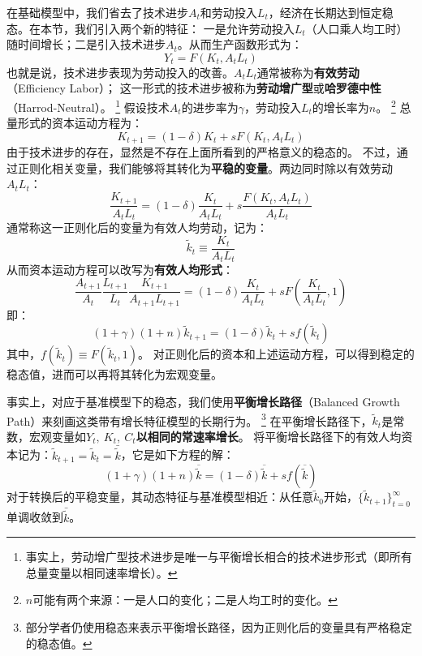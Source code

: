 在基础模型中，我们省去了技术进步$A_t$和劳动投入$L_t$，经济在长期达到恒定稳态。在本节，我们引入两个新的特征：
一是允许劳动投入$L_t$（人口乘人均工时）随时间增长；二是引入技术进步$A_t$。从而生产函数形式为：
\begin{equation*}
    Y_t = F\left(K_t, A_tL_t\right)
\end{equation*}
也就是说，技术进步表现为劳动投入的改善。$A_tL_t$通常被称为\textbf{有效劳动}（Efficiency Labor）；
这一形式的技术进步被称为\textbf{劳动增广型}或\textbf{哈罗德中性}（Harrod-Neutral）。
\footnote{事实上，劳动增广型技术进步是唯一与平衡增长相合的技术进步形式（即所有总量变量以相同速率增长）。}
假设技术$A_t$的进步率为$\gamma$，劳动投入$L_t$的增长率为$n$。
\footnote{$n$可能有两个来源：一是人口的变化；二是人均工时的变化。}
总量形式的资本运动方程为：
\begin{equation*}
    K_{t+1}=(1-\delta) K_t+s F\left(K_t, A_t L_t\right)
\end{equation*}
由于技术进步的存在，显然是不存在上面所看到的严格意义的稳态的。
不过，通过正则化相关变量，我们能够将其转化为\textbf{平稳的变量}。两边同时除以有效劳动$A_tL_t$：
\begin{equation*}
    \frac{K_{t+1}}{A_t L_t}=(1-\delta) \frac{K_t}{A_t L_t}+s \frac{F\left(K_t, A_t L_t\right)}{A_t L_t}
\end{equation*}
通常称这一正则化后的变量为有效人均劳动，记为：
\begin{equation*}
    \tilde{k}_t \equiv \frac{K_t}{A_tL_t}
\end{equation*}
从而资本运动方程可以改写为\textbf{有效人均形式}：
\begin{equation*}
    \frac{A_{t+1}}{A_t} \frac{L_{t+1}}{L_t} \frac{K_{t+1}}{A_{t+1} L_{t+1}}=(1-\delta) 
        \frac{K_t}{A_t L_t}+s F\left(\frac{K_t}{A_t L_t}, 1\right)
\end{equation*}
即：
\begin{equation}    \label{eq-k-law-of-motion-bgp}
    (1+\gamma)(1+n) \tilde{k}_{t+1}=(1-\delta) \tilde{k}_t+s f(\tilde{k}_t)
\end{equation}
其中，$f(\tilde{k}_t) \equiv F(\tilde{k}_t,1)$。
对正则化后的资本和上述运动方程，可以得到稳定的稳态值，进而可以再将其转化为宏观变量。

事实上，对应于基准模型下的稳态，我们使用\textbf{平衡增长路径}（Balanced Growth Path）来刻画这类带有增长特征模型的长期行为。
\footnote{部分学者仍使用稳态来表示平衡增长路径，因为正则化后的变量具有严格稳定的稳态值。}
在平衡增长路径下，$\tilde{k}_t$是常数，宏观变量如$Y_t,~K_t,~C_t$\textbf{以相同的常速率增长}。
将平衡增长路径下的有效人均资本记为：$\tilde{k}_{t+1}=\tilde{k}_t=\bar{\tilde{k}}$，它是如下方程的解：
\begin{equation*}
    (1+\gamma)(1+n) \overline{\tilde{k}}=(1-\delta) \overline{\tilde{k}}+s f(\overline{\tilde{k}})
\end{equation*}
对于转换后的平稳变量，其动态特征与基准模型相近：从任意$\tilde{k}_0$开始，$\{\tilde{k}_{t+1}\}_{t=0}^{\infty}$
单调收敛到$\bar{\tilde{k}}$。

